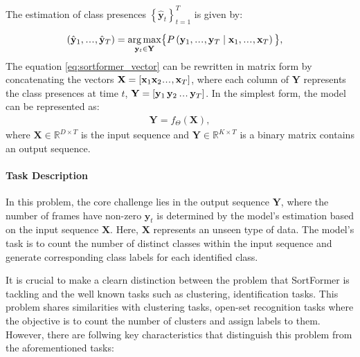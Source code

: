 \documentclass{article}
\newcommand\sdots{\makebox[1em][c]{.\hfil.\hfil.}}
\begin{document}
The estimation of class presences $\left\{\hat{\mathbf{y}}_t\right\}_{t=1}^T$ is given by:

\begin{align}
  (\hat{\mathbf{y}}_1, \sdots, \hat{\mathbf{y}}_T) & = \underset{\mathbf{y}_t \in \mathbf{Y}}{\arg\max} \big\{ P\left(\mathbf{y}_1, \sdots, \mathbf{y}_T \mid \mathbf{x}_1, \sdots, \mathbf{x}_T\right) \big\},
  \label{eq:sortformer_vector}
\end{align}
The equation \ref{eq:sortformer_vector} can be rewritten in matrix form by concatenating the vectors $ \mathbf{X} = [ \mathbf{x}_1 \mathbf{x}_2 \sdots, \mathbf{x}_T ] $,
where each column of $\mathbf{Y}$ represents the class presences at time $t$, $ \mathbf{Y} = [\mathbf{y}_1 \, \mathbf{y}_2 \, \sdots \, \mathbf{y}_T]$.
In the simplest form, the model can be represented as:
\begin{align}
  \mathbf{Y} = f_{\Theta}\left(\mathbf{X}\right),
\end{align}
where \( \mathbf{X} \in \mathbb{R}^{D \times T} \) is the input sequence and \( \mathbf{Y} \in \mathbb{R}^{K \times T} \) is a binary matrix contains an output sequence.

\paragraph{Task Description}
In this problem, the core challenge lies in the output sequence $\mathbf{Y}$, where the number of frames have non-zero $\mathbf{y}_{t}$ is determined by the model's estimation
based on the input sequence $\mathbf{X}$. Here, $\mathbf{X}$ represents an unseen type of data. The model's task is to count the number of distinct classes
within the input sequence and generate corresponding class labels for each identified class.

It is crucial to make a clearn distinction between the problem that SortFormer is tackling and the well known tasks such as clustering, identification tasks.
This problem shares similarities with clustering tasks, open-set recognition tasks where the objective is to count the number of clusters and assign labels to them. However,
there are follwing key characteristics that distinguish this problem from the aforementioned tasks:
\end{document}
